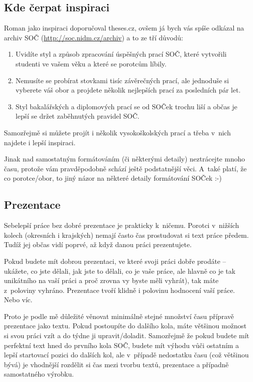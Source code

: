 \documentclass{template/socthesis}
\begin{document}
\subsection{Kde čerpat inspiraci}
Roman jako inspiraci doporučoval theses.cz, ovšem já bych vás spíše odkázal na archiv SOČ (\url{http://soc.nidm.cz/archiv}) a to ze tří důvodů:

\begin{enumerate}[label=\alph*)]
	\item Uvidíte styl a způsob zpracování úspěšných prací SOČ, které vytvořili studenti ve vašem věku a které se porotcům líbily.
	\item Nemusíte se probírat stovkami tisíc závěrečných prací, ale jednoduše si vyberete váš obor a projdete několik nejlepších prací za posledních pár let.
	\item Styl bakalářských a diplomových prací se od SOČek trochu liší a občas je lepší se držet zaběhnutých pravidel SOČ.
\end{enumerate}
Samozřejmě si můžete projít i několik vysokoškolských prací a třeba v~nich najdete i lepší inspiraci.

Jinak nad samostatným formátováním (či některými detaily) neztrácejte mnoho času, protože vám pravděpodobně schází ještě podstatnější věci. A~také platí, že co porotce/obor, to jiný názor na některé detaily formátování SOČek :-)

\subsection{Prezentace}
Sebelepší práce bez dobré prezentace je prakticky k~ničemu. Porotci v~nižších kolech (okresních i krajských) nemají často čas prostudovat si text práce předem. Tudíž jej občas vidí poprvé, až když danou práci prezentujete. 

Pokud budete mít dobrou prezentaci, ve které svoji práci dobře prodáte – ukážete, co jste dělali, jak jste to dělali, co je vaše práce, ale hlavně co je tak unikátního na vaší práci a proč zrovna vy byste měli vyhrát), tak máte z~poloviny vyhráno. Prezentace tvoří klidně i polovinu hodnocení vaší práce. Nebo víc.

Proto je podle mě důležité věnovat minimálně stejné množství času přípravě prezentace jako textu. Pokud postoupíte do dalšího kola, máte většinou možnost si svou práci vzít a do týdne ji upravit/doladit. Samozřejmě že pokud budete mít perfektní text hned do prvního kola SOČ, budete mít výhodu vůči ostatním a lepší startovací pozici do dalších kol, ale v~případě nedostatku času (což většinou bývá) je vhodnější rozdělit si čas mezi tvorbu textů, prezentace a případně samostatného výrobku.
\end{document}
